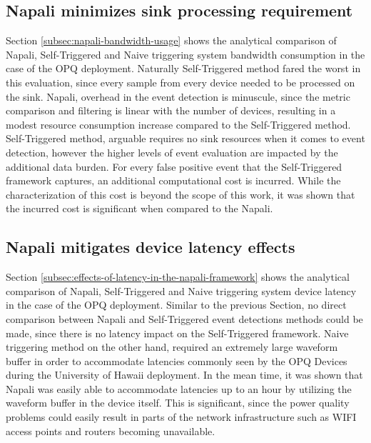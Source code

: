 \subsection{Napali minimizes sink processing requirement}\label{subsec:conc:napali-minimizes-sink-processing-requirement}
Section \ref{subsec:napali-bandwidth-usage} shows the analytical comparison of Napali, Self-Triggered and Naive triggering system bandwidth consumption in the case of the OPQ deployment.
Naturally Self-Triggered method fared the worst in this evaluation, since every sample from every device needed to be processed on the sink.
Napali, overhead in the event detection is minuscule, since the metric comparison and filtering is linear with the number of devices,
resulting in a modest resource consumption increase compared to the Self-Triggered method.
Self-Triggered method, arguable requires no sink resources when it comes to event detection, however the higher levels of event evaluation are impacted by the additional data burden.
For every false positive event that the Self-Triggered framework captures, an additional computational cost is incurred.
While the characterization of this cost is beyond the scope of this work, it was shown that the incurred cost is significant when compared to the Napali.

\subsection{Napali mitigates device latency effects}\label{subsec:conc:napali-mitigates-device-latency-effects}
Section \ref{subsec:effects-of-latency-in-the-napali-framework} shows the analytical comparison of Napali, Self-Triggered and Naive triggering system device latency in the case of the OPQ deployment.
Similar to the previous Section, no direct comparison between Napali and Self-Triggered event detections methods could be made, since there is no latency impact on the Self-Triggered framework.
Naive triggering method on the other hand, required an extremely large waveform buffer in order to accommodate latencies commonly seen by the OPQ Devices during the University of Hawaii deployment.
In the mean time, it was shown that Napali was easily able to accommodate latencies up to an hour by utilizing the waveform buffer in the device itself.
This is significant, since the power quality problems could easily result in parts of the network infrastructure such as WIFI access points and routers becoming unavailable.

